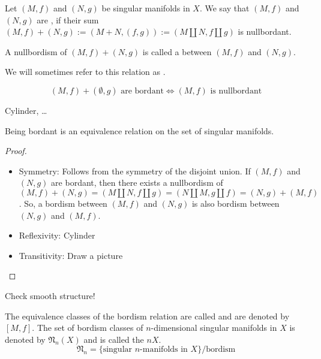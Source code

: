 \documentclass[a4paper,11pt]{article}
\begin{document}
\begin{definition}\label{bordant}
    Let \((M,f)\) and \((N,g)\) be singular manifolds in \(X\). We say that \((M,f)\) and \((N,g)\) are , if their sum \((M,f)+(N,g):=(M+N, (f,g)):=(M\amalg N, f\amalg g)\) is nullbordant.

    A nullbordism of \((M,f)+(N,g)\) is called a  between \((M,f)\) and \((N,g)\).
\end{definition}

We will sometimes refer to this relation as .

\begin{remark}
    \[(M,f)+(\emptyset,g) \text{ are bordant} \iff (M,f) \text{ is nullbordant}\]
\end{remark}

\begin{example}
    Cylinder, \dots
\end{example}

\begin{nonex}
\end{nonex}

\begin{proposition}\cite[II, Satz 1.4]{brocker}
    Being bordant is an equivalence relation on the set of singular manifolds.
\end{proposition}

\begin{proof}\cite{brocker}
    \begin{itemize}
        \item Symmetry: Follows from the symmetry of the disjoint union. If \((M,f)\) and \((N,g)\) are bordant, then there exists a nullbordism of \((M,f)+(N,g)=(M\amalg N, f\amalg g) = (N\amalg M, g\amalg f) = (N,g)+ (M,f)\). So, a bordism between \((M,f)\) and \((N,g)\) is also bordism between \((N,g)\) and \((M,f)\).
        \item Reflexivity: Cylinder
        \item Transitivity: Draw a picture
    \end{itemize}
\end{proof}

Check smooth structure!

\begin{definition}
    The equivalence classes of the bordism relation are called  and are denoted by \([M,f]\).
    The set of bordism classes of \(n\)-dimensional singular manifolds in \(X\) is denoted by \(\mathfrak{N}_n(X)\) and is called the \(n\)\(X\).
    \[\mathfrak{N}_n=\{\text{singular \(n\)-manifolds in \(X\)}\}\big/\text{bordism}\]
\end{definition}
\end{document}

